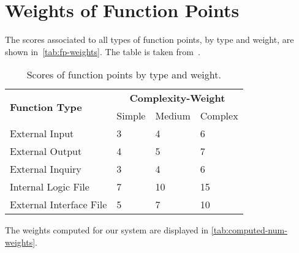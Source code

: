 \section{Weights of Function Points}
The scores associated to all types of function points, by type and weight, are shown in~\autoref{tab:fp-weights}. The table is taken from~\cite{cocomo-manual}.
\begin{table}
    \centering
    \begin{tabular}{| l | l | l | l |}
        \hline
        \multirow{2}{*}{\textbf{Function Type}} & \multicolumn{3}{c|}{\textbf{Complexity-Weight}} \\
        \cline{2-4}
        & Simple & Medium & Complex \\
        \hline
        External Input          & 3     & 4     & 6     \\
        External Output         & 4     & 5     & 7     \\
        External Inquiry        & 3     & 4     & 6     \\
        Internal Logic File     & 7     & 10    & 15    \\
        External Interface File & 5     & 7     & 10    \\
        \hline
    \end{tabular}
    \caption{Scores of function points by type and weight.}
    \label{tab:fp-weights}
\end{table}

The weights computed for our system are displayed in \autoref{tab:computed-num-weights}.

